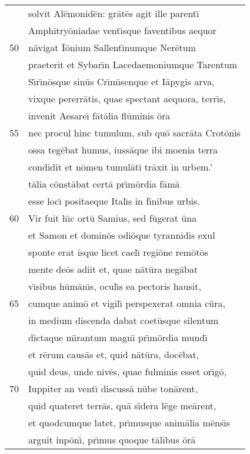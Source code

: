 \documentclass[paper=6in:9in,pagesize=pdftex,
               headinclude=on,footinclude=on,12pt]{scrbook}
\begin{document}
\begin{longtable}[p]{ r l }
 & solvit Al\=emonid\=en: gr\=at\=es agit ille parent\={\i}\\ 
 & Amphitry\=oniadae vent\={\i}sque faventibus aequor\\ 
50 & n\=avigat \=I\=onium Sallent\={\i}numque Ner\=etum\\ 
 & praeterit et Sybar\={\i}n Lacedaemoniumque Tarentum\\ 
 & S\={\i}r\={\i}n\=osque sin\=us Cr\={\i}m\={\i}senque et I\=apygis arva,\\ 
 & vixque pererr\=atis, quae spectant aequora, terr\={\i}s,\\ 
 & invenit Aesare\={\i} f\=at\=alia fl\=uminis \=ora\\ 
55 & nec procul hinc tumulum, sub qu\=o sacr\=ata Crot\=on\={\i}s\\ 
 & ossa teg\=ebat humus, iuss\=aque ibi moenia terra\\ 
 & condidit et n\=omen tumul\=at\={\i} tr\=axit in urbem.'\\ 
 & t\=alia c\=onst\=abat cert\=a pr\={\i}m\=ordia f\=am\=a\\ 
 & esse loc\={\i} positaeque Ital\={\i}s in f\={\i}nibus urbis.\\ 
60 & \indent Vir fuit h\={\i}c ort\=u Samius, sed f\=ugerat \=una\\ 
 & et Samon et domin\=os odi\=oque tyrannidis exul\\ 
 & sponte erat isque licet cael\={\i} regi\=one rem\=ot\=os\\ 
 & mente de\=os adiit et, quae n\=at\=ura neg\=abat\\ 
 & v\={\i}sibus h\=um\=an\={\i}s, ocul\={\i}s ea pectoris hausit,\\ 
65 & cumque anim\=o et vigil\={\i} perspexerat omnia c\=ura,\\ 
 & in medium discenda dabat coet\=usque silentum\\ 
 & dictaque m\={\i}rantum magn\={\i} pr\={\i}m\=ordia mund\={\i}\\ 
 & et r\=erum caus\=as et, quid n\=at\=ura, doc\=ebat,\\ 
 & quid deus, unde niv\=es, quae fulminis esset or\={\i}g\=o,\\ 
70 & Iuppiter an vent\={\i} discuss\=a n\=ube ton\=arent,\\ 
 & quid quateret terr\=as, qu\=a s\={\i}dera l\=ege me\=arent,\\ 
 & et quodcumque latet, pr\={\i}musque anim\=alia m\=ens\={\i}s\\ 
 & arguit inp\=on\={\i}, pr\={\i}mus quoque t\=alibus \=or\=a\\ 

\end{longtable}
\end{document}
